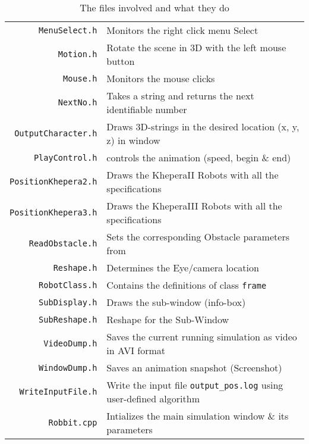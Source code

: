 \documentclass[10pt,a4paper]{article}
\begin{document}
\begin{table}[ht]
\begin{tabular}{| r | l |}
\texttt{MenuSelect.h}				& Monitors the right click menu Select \\
\texttt{Motion.h}					& Rotate the scene in 3D with the left mouse button \\
\texttt{Mouse.h}					& Monitors the mouse clicks \\
\texttt{NextNo.h}					& Takes a string and returns the next identifiable number \\
\texttt{OutputCharacter.h}			& Draws 3D-strings in the desired location (x, y, z) in window \\
\texttt{PlayControl.h}				& controls the animation (speed, begin \& end) \\
\texttt{PositionKhepera2.h}			& Draws the KheperaII Robots with all the specifications \\
\texttt{PositionKhepera3.h}			& Draws the KheperaIII Robots with all the specifications \\
\texttt{ReadObstacle.h}				& Sets the corresponding Obstacle parameters from  \\
\texttt{Reshape.h}					& Determines the Eye/camera location \\
\texttt{RobotClass.h}				& Contains the definitions of class \texttt{frame} \\
\texttt{SubDisplay.h}				& Draws the sub-window (info-box) \\
\texttt{SubReshape.h}				& Reshape for the Sub-Window \\
\texttt{VideoDump.h}				& Saves the current running simulation as video in AVI format \\
\texttt{WindowDump.h}				& Saves an animation snapshot (Screenshot) \\
\texttt{WriteInputFile.h}			& Write the input file \texttt{output\_pos.log} using user-defined algorithm \\
\hline
\texttt{Robbit.cpp}					& Intializes the main simulation window \& its parameters \\\hline
\end{tabular}
\caption{\sf The files involved and what they do}
\label{filename}
\end{table}
\end{document}
